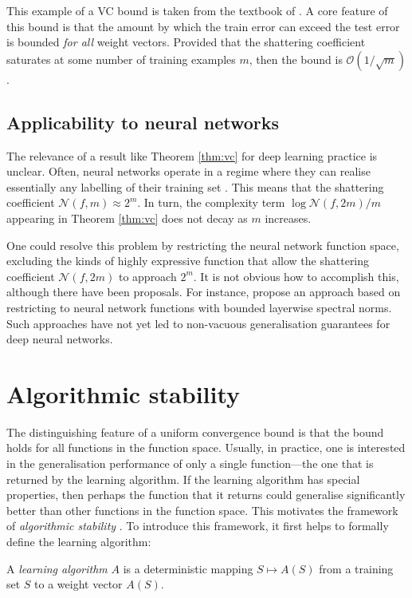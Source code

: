 \begin{refsection}
This example of a VC bound is taken from the textbook of \citet{lwk}. A core feature of this bound is that the amount by which the train error can exceed the test error is bounded \textit{for all} weight vectors. Provided that the shattering coefficient saturates at some number of training examples $m$, then the bound is $\mathcal{O}(1/\sqrt{m})$.

\subsection{Applicability to neural networks} 
The relevance of a result like Theorem \ref{thm:vc} for deep learning practice is unclear. Often, neural networks operate in a regime where they can realise essentially any labelling of their training set \citep{Zhang2017UnderstandingDL}. This means that the shattering coefficient $\mathcal{N}(f,m) \approx 2^m$. In turn, the complexity term $\log \mathcal{N}(f,2m) / m$ appearing in Theorem \ref{thm:vc} does not decay as $m$ increases.

One could resolve this problem by restricting the neural network function space, excluding the kinds of highly expressive function that allow the shattering coefficient $\mathcal{N}(f,2m)$ to approach $2^m$. It is not obvious how to accomplish this, although there have been proposals. For instance, \citet{specnorm} propose an approach based on restricting to neural network functions with bounded layerwise spectral norms. Such approaches have not yet led to non-vacuous generalisation guarantees for deep neural networks.

\section{Algorithmic stability}

The distinguishing feature of a uniform convergence bound is that the bound holds for all functions in the function space. Usually, in practice, one is interested in the generalisation performance of only a single function---the one that is returned by the learning algorithm. If the learning algorithm has special properties, then perhaps the function that it returns could generalise significantly better than other functions in the function space. This motivates the framework of \textit{algorithmic stability} \citep{stability}. To introduce this framework, it first helps to formally define the learning algorithm:

\begin{definition}\label{def:algorithm} A \textit{learning algorithm} $A$ is a deterministic mapping $S \mapsto A(S)$ from a training set $S$ to a weight vector $A(S)$.
\end{definition}


\end{refsection}
